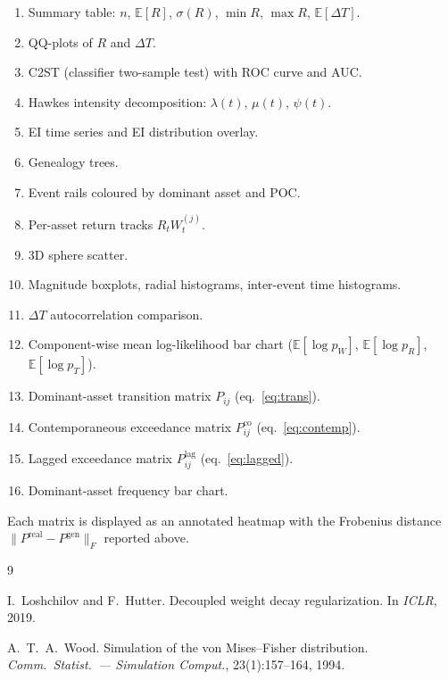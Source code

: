 \documentclass[11pt,a4paper]{article}
\newcommand{\E}{\mathbb{E}}
\begin{document}
\begin{enumerate}[nosep]
  \item Summary table: $n$, $\E[R]$, $\sigma(R)$,
        $\min R$, $\max R$, $\E[\Delta T]$.
  \item QQ-plots of $R$ and $\Delta T$.
  \item C2ST (classifier two-sample test) with ROC curve and AUC.
  \item Hawkes intensity decomposition: $\lambda(t)$, $\mu(t)$, $\psi(t)$.
  \item EI time series and EI distribution overlay.
  \item Genealogy trees.
  \item Event rails coloured by dominant asset and POC.
  \item Per-asset return tracks $R_t W_t^{(j)}$.
  \item 3D sphere scatter.
  \item Magnitude boxplots, radial histograms,
        inter-event time histograms.
  \item $\Delta T$ autocorrelation comparison.
  \item Component-wise mean log-likelihood bar chart
        ($\E[\log p_W]$, $\E[\log p_R]$, $\E[\log p_T]$).
  \item Dominant-asset transition matrix $P_{ij}$ (eq.~\ref{eq:trans}).
  \item Contemporaneous exceedance matrix $P_{ij}^{\text{co}}$
        (eq.~\ref{eq:contemp}).
  \item Lagged exceedance matrix $P_{ij}^{\text{lag}}$
        (eq.~\ref{eq:lagged}).
  \item Dominant-asset frequency bar chart.
\end{enumerate}

Each matrix is displayed as an annotated heatmap with the Frobenius
distance $\|P^{\text{real}} - P^{\text{gen}}\|_F$ reported above.

\begin{thebibliography}{9}

I.~Loshchilov and F.~Hutter.
\newblock Decoupled weight decay regularization.
\newblock In \emph{ICLR}, 2019.

A.~T.~A.~Wood.
\newblock Simulation of the von Mises--Fisher distribution.
\newblock \emph{Comm.\ Statist.\ --- Simulation Comput.},
  23(1):157--164, 1994.

\end{thebibliography}
\end{document}

